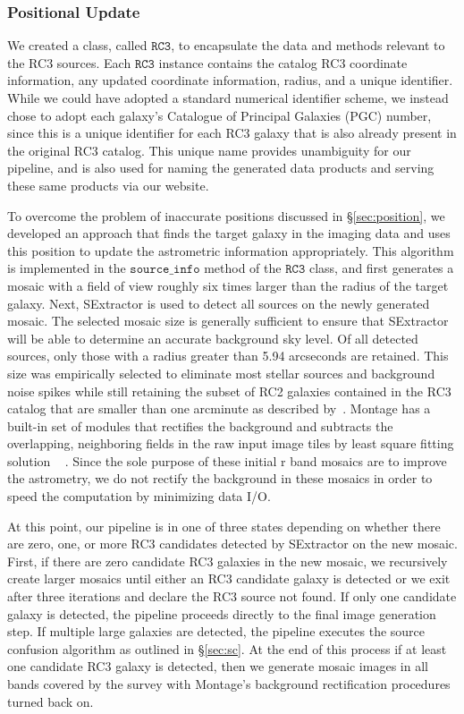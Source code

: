 \documentclass[authoryear, 12pt, 5p, times]{elsarticle}
\begin{document}
\subsubsection{Positional Update\label{pos-sec}} 

We created a class, called $\texttt{RC3}$, to encapsulate the data and methods relevant to the RC3 sources. Each $\texttt{RC3}$ instance contains the catalog RC3 coordinate information, any updated coordinate information, radius, and a unique identifier. While we could have adopted a standard numerical identifier scheme, we instead chose to adopt each galaxy's Catalogue of Principal Galaxies (PGC) number, since this is a unique identifier for each RC3 galaxy that is also already present in the original RC3 catalog. This unique name provides unambiguity for our pipeline, and is also used for naming the generated data products and serving these same products via our website.

To overcome the problem of inaccurate positions discussed in \S\ref{sec:position}, we developed an approach that finds the target galaxy in the imaging data and uses this position to update the astrometric information appropriately. This algorithm is implemented in the $\texttt{source\_info}$ method of the $\texttt{RC3}$ class, and first generates a mosaic with a field of view roughly six times larger than the radius of the target galaxy.  Next, SExtractor is used to detect all sources on the newly generated mosaic. The selected mosaic size is generally sufficient to ensure that SExtractor will be able to determine an accurate background sky level. Of all detected sources, only those with a radius greater than 5.94 arcseconds are retained. This size was empirically selected to eliminate most stellar sources and background noise spikes while still retaining the subset of RC2 galaxies contained in the RC3 catalog that are smaller than one arcminute as described by~\citealp{rc2}. Montage has a built-in set of modules that rectifies the background and subtracts the overlapping, neighboring fields in the raw input image tiles by least square fitting solution ~\citep{montage} . Since the sole purpose of these initial r band mosaics are to improve the astrometry, we do not rectify the background in these mosaics in order to speed the computation by minimizing data I/O.

At this point, our pipeline is in one of three states depending on whether there are zero, one, or more RC3 candidates detected by SExtractor on the new mosaic. First, if there are zero candidate RC3 galaxies in the new mosaic, we recursively create larger mosaics until either an RC3 candidate galaxy is detected or we exit after three iterations and declare the RC3 source not found. If only one candidate galaxy is detected, the pipeline proceeds directly to the final image generation step. If multiple large galaxies are detected, the pipeline executes the source confusion algorithm as outlined in \S\ref{sec:sc}. At the end of this process if at least one candidate RC3 galaxy is detected, then we generate mosaic images in all bands covered by the survey with Montage's background rectification procedures turned back on.
\end{document}
